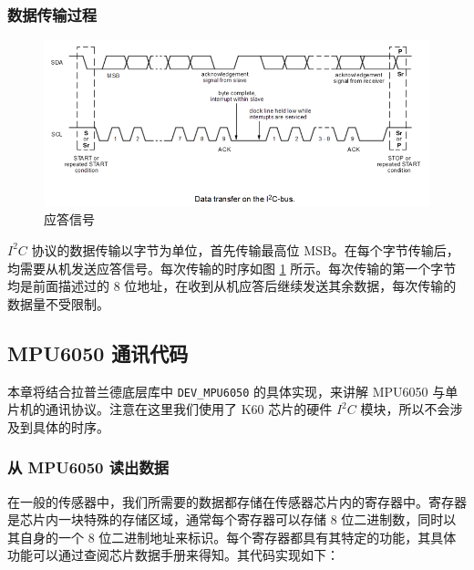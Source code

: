 \subsubsection{数据传输过程}

\begin{figure}[h]
\centering %
\includegraphics[width=.8\textwidth]{i2c_timing.png}
\caption{应答信号}
\label{i2c_timing}
\end{figure}

$I^2C$ 协议的数据传输以字节为单位，首先传输最高位 MSB。在每个字节传输后，均需要从机发送应答信号。每次传输的时序如图 \ref{i2c_timing} 所示。每次传输的第一个字节均是前面描述过的 8 位地址，在收到从机应答后继续发送其余数据，每次传输的数据量不受限制。

\subsection{MPU6050 通讯代码}
本章将结合拉普兰德底层库中 \lstinline{DEV_MPU6050} 的具体实现，来讲解 MPU6050 与单片机的通讯协议。注意在这里我们使用了 K60 芯片的硬件 $I^2C$ 模块，所以不会涉及到具体的时序。

\subsubsection{从 MPU6050 读出数据}
在一般的传感器中，我们所需要的数据都存储在传感器芯片内的寄存器中。寄存器是芯片内一块特殊的存储区域，通常每个寄存器可以存储 8 位二进制数，同时以其自身的一个 8 位二进制地址来标识。每个寄存器都具有其特定的功能，其具体功能可以通过查阅芯片数据手册来得知。其代码实现如下：

